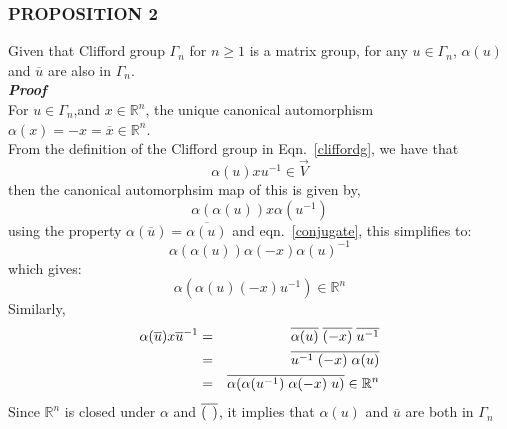 \documentclass[12pt,onecolumn,letterpaper]{article} %
\begin{document}
 \subsubsection{PROPOSITION 2}\label{prop2}
 Given that Clifford group $\Gamma_n$ for $n\ge 1$ is a matrix group, for any $u\in\Gamma_n$, $\alpha(u)$ and $\overline{u}$ are also in $\Gamma_n$.\\
  \textbf{\emph{Proof}}\\
  For $u\in\Gamma_n$,and $x\in \mathbb{R}^n$, the unique canonical automorphism $\alpha(x)=-x=\overline{x}\in \mathbb{R}^n$.\\
  From the definition of the Clifford group in Eqn.~\ref{cliffordg}, we have that
  $$\alpha(u)xu^{-1}\in\vec{V}$$
  then the canonical automorphsim map of this is given by,
  $$\alpha(\alpha(u))x\alpha(u^{-1})$$
  using the property $\alpha(\overline{u})=\overline{\alpha(u)}$ and eqn.~\ref{conjugate}, this simplifies to:
  $$\alpha(\alpha(u))\alpha(-x)\alpha(u)^{-1}$$
  which gives:
  $$\alpha\left(\alpha(u)(-x)u^{-1}\right)\in \mathbb{R}^n$$
 Similarly,
   \begin{eqnarray*}
    \alpha(\overline{u})x\overline{u}^{-1}&=&\overline{\alpha(u)}\hspace{.1cm}\overline{(-x)}\hspace{.1cm}\overline{u^{-1}}\\
     &=&\overline{u^{-1}\hspace{.1cm}(-x)\hspace{.1cm}\alpha(u)}\\
   &=& \overline{\alpha(\alpha(u^{-1})\hspace{.1cm}\alpha(-x)\hspace{.1cm}u)}\in \mathbb{R}^n
\end{eqnarray*}
Since $\mathbb{R}^n$ is closed under $\alpha$ and $\overline{(\hspace{.15cm})}$, it implies that $\alpha(u)$ and $\overline{u}$ are both in $\Gamma_n$
\end{document}
